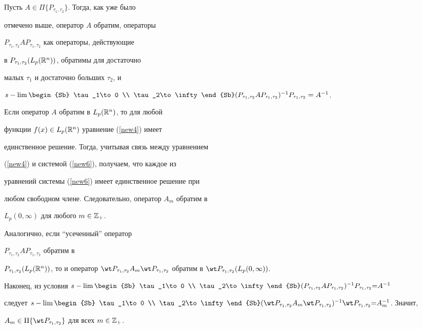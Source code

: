 \begin{pf}


Пусть $A\in \Pi\{P_{\tau_1,\tau_2}\}$. Тогда, как уже было


отмечено выше, оператор $A$ обратим, операторы


$P_{\tau_1,\tau_2}AP_{\tau_1,\tau_2}$ как операторы, действующие


в $P_{\tau_1,\tau_2}(L_p({\Bbb R}^n))$, обратимы для достаточно


малых $\tau_1$ и достаточно больших $\tau_2$, и


$s-\lim\limits\begin{Sb} \tau_1\to 0 \\ \tau_2\to\infty \end{Sb}


(P_{\tau_1,\tau_2}AP_{\tau_1,\tau_2})^{-1}P_{\tau_1,\tau_2}=A^{-1}$.





Если оператор $A$ обратим в $L_p({\Bbb R^n})$, то для любой


функции $f(x)\in L_p({\Bbb R^n})$ уравнение (\ref{new4}) имеет


единственное решение. Тогда, учитывая связь между уравнением


(\ref{new4}) и системой (\ref{new6}), получаем, что каждое из


уравнений системы (\ref{new6}) имеет единственное решение при


любом свободном члене. Следовательно, оператор $A_m$ обратим в


$L_p(0,\infty)$ для любого $m\in {\Bbb Z}_+$.





Аналогично, если ``усеченный'' оператор


$P_{\tau_1,\tau_2}AP_{\tau_1,\tau_2}$ обратим в


$P_{\tau_1,\tau_2}(L_p({\Bbb R}^n))$, то и оператор $\wt


P_{\tau_1,\tau_2}A_m\wt  P_{\tau_1,\tau_2}$ обратим в $\wt


P_{\tau_1,\tau_2}(L_p(0,\infty))$.





Наконец, из условия $s-\lim\limits\begin{Sb} \tau_1\to


0 \\ \tau_2\to\infty \end{Sb}


(P_{\tau_1,\tau_2}AP_{\tau_1,\tau_2})^{-1}P_{\tau_1,\tau_2}{=}A^{-1}$


следует $s-\lim\limits\begin{Sb} \tau_1\to


0 \\ \tau_2\to\infty \end{Sb} (\wt P_{\tau_1,\tau_2}A_m \wt


P_{\tau_1,\tau_2})^{-1}\wt P_{\tau_1,\tau_2}{=}\linebreak A_m^{-1}$. Значит,


$A_m\in \Pi\{\wt P_{\tau_1,\tau_2}\}$ для всех $m\in \Bbb Z_+$.


\end{pf}
